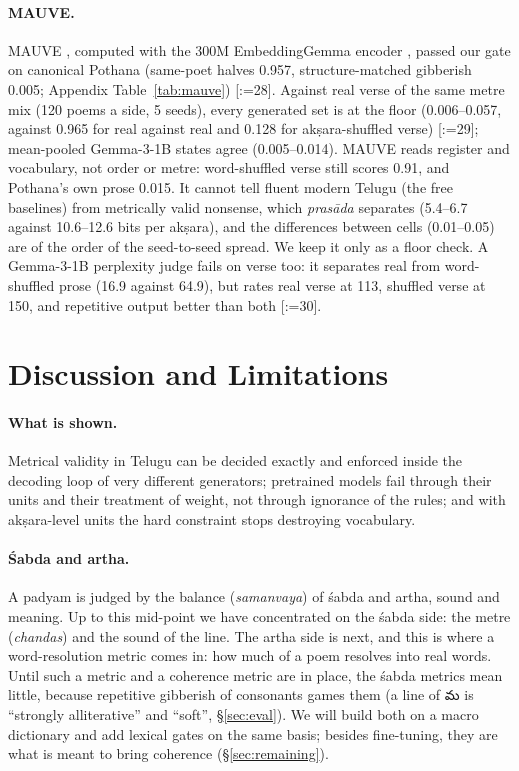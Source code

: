 \documentclass[11pt]{article}
\makeatletter
\newcommand{\te}[1]{{\telugufont #1}}
\DeclareRobustCommand{\exref}[1]{{\scriptsize[\def\ex@sep{}\@for\ex@i:=#1\do{\ex@sep
  \expandafter\ex@item\expandafter{\ex@i}\def\ex@sep{, }}]}}
\newcommand{\ex@item}[1]{\in@{-}{#1}\ifin@\ex@range#1\@nil\else\ex@link{#1}\fi}
\def\ex@range#1-#2\@nil{\ex@link{#1}--\ex@link{#2}}
\newcommand{\ex@link}[1]{\hyperref[exp:E#1]{E#1}}
\makeatother
\begin{document}
\paragraph{MAUVE.} MAUVE \citep{pillutla2021mauve}, computed with the 300M EmbeddingGemma encoder
\citep{embeddinggemma2025}, passed our gate on canonical Pothana (same-poet halves 0.957, structure-matched
gibberish 0.005; Appendix Table~\ref{tab:mauve}) \exref{28}. Against real verse of the same metre mix (120 poems a side,
5 seeds), every generated set is at the floor (0.006--0.057, against 0.965 for real against real and 0.128
for akṣara-shuffled verse) \exref{29}; mean-pooled Gemma-3-1B states \citep{gemma3_2025} agree (0.005--0.014). MAUVE
reads register and vocabulary, not order or metre: word-shuffled verse still scores 0.91, and Pothana's own
prose 0.015. It cannot tell fluent modern Telugu (the free baselines) from metrically valid nonsense, which
\textit{prasāda} separates (5.4--6.7 against 10.6--12.6 bits per akṣara), and the differences between cells
(0.01--0.05) are of the order of the seed-to-seed spread. We keep it only as a floor check. A Gemma-3-1B
perplexity judge fails on verse too: it separates real from word-shuffled prose (16.9 against 64.9), but
rates real verse at 113, shuffled verse at 150, and repetitive output better than both \exref{30}.

\section{Discussion and Limitations}\label{sec:discussion}

\paragraph{What is shown.} Metrical validity in Telugu can be decided exactly and enforced inside the decoding
loop of very different generators; pretrained models fail through their units and their treatment of
weight, not through ignorance of the rules; and with akṣara-level units the hard constraint stops destroying
vocabulary.

\paragraph{Śabda and artha.} A padyam is judged by the balance (\textit{samanvaya}) of śabda and artha,
sound and meaning. Up to this mid-point we have concentrated on the śabda side: the metre (\textit{chandas})
and the sound of the line. The artha side is next, and this is where a word-resolution metric comes in: how
much of a poem resolves into real words. Until such a metric and a coherence metric are in place, the
śabda metrics mean little, because repetitive gibberish of consonants games them (a line of \te{మ} is
``strongly alliterative'' and ``soft'', \S\ref{sec:eval}). We will build both on a macro dictionary and add
lexical gates on the same basis; besides fine-tuning, they are what is meant to bring coherence
(\S\ref{sec:remaining}).
\end{document}
